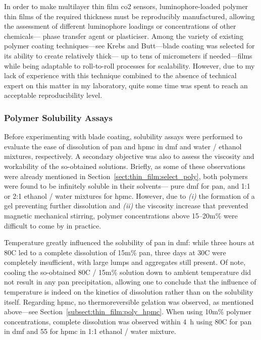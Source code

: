 In order to make multilayer thin film \gls{co2} sensors, luminophore-loaded polymer thin films of the required thickness must be reproducibly manufactured, allowing the assessment of different luminophore loadings or concentrations of other chemicals---\eg{} phase transfer agent or plasticiser. Among the variety of existing polymer coating techniques---see Krebs\cite{krebs2009} and Butt\cite{butt2022}---blade coating was selected for its ability to create relatively thick---\ie{} up to tens of micrometers if needed---films while being adaptable to roll-to-roll processes for scalability. However, due to my lack of experience with this technique combined to the absence of technical expert on this matter in my laboratory, quite some time was spent to reach an acceptable reproducibility level.

\subsubsection{Polymer Solubility Assays}

Before experimenting with blade coating, solubility assays were performed to evaluate the ease of dissolution of \gls{pan} and \gls{hpmc} in \gls{dmf} and water / ethanol mixtures, respectively. A secondary objective was also to assess the viscosity and workability of the so-obtained solutions. Briefly, as some of these observations were already mentioned in Section~\ref{sect:thin_film:select_poly}, both polymers were found to be infinitely soluble in their solvents---\ie{} pure \gls{dmf} for \gls{pan}, and 1:1 or 2:1 ethanol / water mixtures for \gls{hpmc}. However, due to \textit{(i)} the formation of a gel preventing further dissolution and \textit{(ii)} the viscosity increase that prevented magnetic mechanical stirring, polymer concentrations above 15--20m\% were difficult to come by in practice.

Temperature greatly influenced the solubility of \gls{pan} in \gls{dmf}: while three hours at 80{\degree}C led to a complete dissolution of 15m\% \gls{pan}, three days at 30{\degree}C were completely insufficient, with large lumps and aggregates still present. Of note, cooling the so-obtained 80{\degree}C / 15m\% solution down to ambient temperature did not result in any \gls{pan} precipitation, allowing one to conclude that the influence of temperature is indeed on the kinetics of dissolution rather than on the solubility itself. Regarding \gls{hpmc}, no thermoreversible gelation was observed, as mentioned above---see Section~\ref{subsect:thin_film:poly_hpmc}. When using 10m\% polymer concentrations, complete dissolution was observed within 4~h using 80{\degree}C for \gls{pan} in \gls{dmf} and 55{\degree} for \gls{hpmc} in 1:1 ethanol / water mixture.

